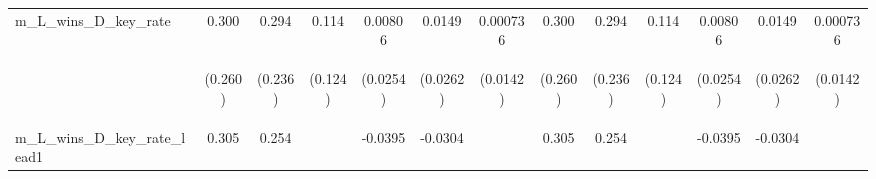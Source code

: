 \documentclass[]{article}
\begin{document}
\begin{center}
\begin{tabular}{lcccccccccccc}
m\_L\_wins\_D\_key\_rate & 0.300 & 0.294 & 0.114 & 0.00806 & 0.0149 & 0.000736 & 0.300 & 0.294 & 0.114 & 0.00806 & 0.0149 & 0.000736 \\
\vspace{4pt} & \begin{footnotesize}(0.260)\end{footnotesize} & \begin{footnotesize}(0.236)\end{footnotesize} & \begin{footnotesize}(0.124)\end{footnotesize} & \begin{footnotesize}(0.0254)\end{footnotesize} & \begin{footnotesize}(0.0262)\end{footnotesize} & \begin{footnotesize}(0.0142)\end{footnotesize} & \begin{footnotesize}(0.260)\end{footnotesize} & \begin{footnotesize}(0.236)\end{footnotesize} & \begin{footnotesize}(0.124)\end{footnotesize} & \begin{footnotesize}(0.0254)\end{footnotesize} & \begin{footnotesize}(0.0262)\end{footnotesize} & \begin{footnotesize}(0.0142)\end{footnotesize} \\
m\_L\_wins\_D\_key\_rate\_lead1 & 0.305 & 0.254 &  & -0.0395 & -0.0304 &  & 0.305 & 0.254 &  & -0.0395 & -0.0304 &  \\

\end{tabular}
\end{center}
\end{document}

